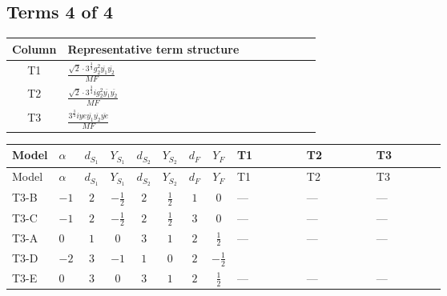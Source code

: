\documentclass[8pt]{article}
\begin{document}
\begin{landscape}
\subsection*{Terms 4 of 4}
\begin{center}
\begin{tabular}{@{}c >{\raggedright\arraybackslash}p{0.82\linewidth}@{}}
\toprule
Column & Representative term structure \\
\midrule
T1 & \(\displaystyle \frac{\sqrt{2} \cdot 3^{\frac{3}{4}} g_{2}^{2} \overline{y_{1}} \overline{y_{2}}}{MF}\) \\
\midrule
T2 & \(\displaystyle \frac{\sqrt{2} \cdot 3^{\frac{3}{4}} i g_{2}^{2} \overline{y_{1}} \overline{y_{2}}}{MF}\) \\
\midrule
T3 & \(\displaystyle \frac{3^{\frac{3}{4}} i ye \overline{y_{1}} \overline{y_{2}} \overline{ye}}{MF}\) \\
\midrule
\bottomrule
\end{tabular}
\end{center}
\smallskip
\tiny
\begin{longtable}{@{}llcccccc >{\raggedright\arraybackslash}p{0.21\linewidth} >{\raggedright\arraybackslash}p{0.21\linewidth} >{\raggedright\arraybackslash}p{0.21\linewidth}@{}}
\toprule
Model & $\alpha$ & $d_{S_1}$ & $Y_{S_1}$ & $d_{S_2}$ & $Y_{S_2}$ & $d_F$ & $Y_F$ & T1 & T2 & T3 \\
\midrule
\endfirsthead
\toprule
Model & $\alpha$ & $d_{S_1}$ & $Y_{S_1}$ & $d_{S_2}$ & $Y_{S_2}$ & $d_F$ & $Y_F$ & T1 & T2 & T3 \\
\midrule
\endhead
T3-B & $-1$ & $2$ & $-\frac{1}{2}$ & $2$ & $\frac{1}{2}$ & $1$ & $0$ & --- & --- & --- \\
\midrule
T3-C & $-1$ & $2$ & $-\frac{1}{2}$ & $2$ & $\frac{1}{2}$ & $3$ & $0$ & --- & --- & --- \\
\midrule
T3-A & $0$ & $1$ & $0$ & $3$ & $1$ & $2$ & $\frac{1}{2}$ & --- & --- & --- \\
\midrule
T3-D & $-2$ & $3$ & $-1$ & $1$ & $0$ & $2$ & $-\frac{1}{2}$ & \scriptsize\adjustbox{max width=\linewidth}{$\begin{gathered} \frac{\sqrt{2} \cdot 3^{\frac{3}{4}} g_{2}^{2} \overline{y_{1}} \overline{y_{2}}}{6 MF}\end{gathered}$} & \scriptsize\adjustbox{max width=\linewidth}{$\begin{gathered} - \frac{\sqrt{2} \cdot 3^{\frac{3}{4}} i g_{2}^{2} \overline{y_{1}} \overline{y_{2}}}{6 MF}\end{gathered}$} & \scriptsize\adjustbox{max width=\linewidth}{$\begin{gathered} \frac{3^{\frac{3}{4}} i ye \overline{y_{1}} \overline{y_{2}} \overline{ye}}{12 MF}\end{gathered}$} \\
\midrule
T3-E & $0$ & $3$ & $0$ & $3$ & $1$ & $2$ & $\frac{1}{2}$ & --- & --- & --- \\
\midrule
\bottomrule
\end{longtable}
\clearpage

\end{landscape}
\end{document}
